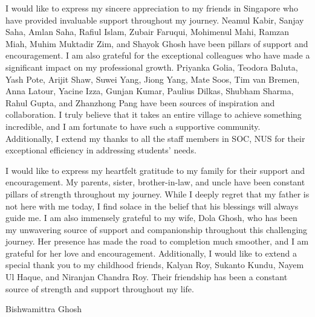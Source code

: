 \begin{acknowledgments}
I would like to express my sincere appreciation to my friends in Singapore who have provided invaluable support throughout my journey. Neamul Kabir, Sanjay Saha, Amlan Saha, Rafiul Islam, Zubair Faruqui, Mohimenul Mahi, Ramzan Miah, Muhim Muktadir Zim, and Shayok Ghosh have been pillars of support and encouragement. I am also grateful for the exceptional colleagues who have made a significant impact on my professional growth. Priyanka Golia, Teodora Baluta, Yash Pote, Arijit Shaw, Suwei Yang, Jiong Yang, Mate Soos, Tim van Bremen, Anna Latour, Yacine Izza, Gunjan Kumar, Paulius Dilkas, Shubham Sharma, Rahul Gupta, and Zhanzhong Pang have been sources of inspiration and collaboration. I truly believe that it takes an entire village to achieve something incredible, and I am fortunate to have such a supportive community. Additionally, I extend my thanks to all the staff members in SOC, NUS for their exceptional efficiency in addressing students' needs. 

I would like to express my heartfelt gratitude to my family for their support and encouragement. My parents, sister, brother-in-law, and uncle have been constant pillars of strength throughout my journey. While I deeply regret that my father is not here with me today, I find solace in the belief that his blessings will always guide me. I am also immensely grateful to my wife, Dola Ghosh, who has been my unwavering source of support and companionship throughout this challenging journey. Her presence has made the road to completion much smoother, and I am grateful for her love and encouragement. Additionally, I would like to extend a special thank you to my childhood friends, Kalyan Roy, Sukanto Kundu, Nayem Ul Haque, and Niranjan Chandra Roy. Their friendship has been a constant source of strength and support throughout my life.



\begin{flushright}
	\vspace{1em}
	Bishwamittra Ghosh
\end{flushright}
	
\end{acknowledgments}
